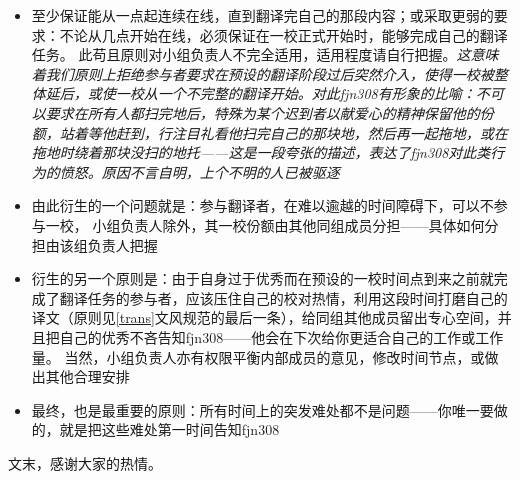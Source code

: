 \documentclass{ctexart}
\begin{document}
\begin{itemize}
    \item 至少保证能从一点起连续在线，直到翻译完自己的那段内容；或采取更弱的要求：不论从几点开始在线，必须保证在一校正式开始时，能够完成自己的翻译任务。{\color{red} 此苟且原则对小组负责人不完全适用，适用程度请自行把握}。\emph{\small 这意味着我们原则上拒绝参与者要求在预设的翻译阶段过后突然介入，使得一校被整体延后，或使一校从一个不完整的翻译开始。对此fjn308有形象的比喻：不可以要求在所有人都扫完地后，特殊为某个迟到者以献爱心的精神保留他的份额，站着等他赶到，行注目礼看他扫完自己的那块地，然后再一起拖地，或在拖地时绕着那块没扫的地托——这是一段夸张的描述，表达了fjn308对此类行为的愤怒。原因不言自明，上个不明的人已被驱逐}
    \item 由此衍生的一个问题就是：参与翻译者，在难以逾越的时间障碍下，可以不参与一校，{\color{red} 小组负责人除外}，其一校份额由其他同组成员分担——具体如何分担由该组负责人把握
    \item 衍生的另一个原则是：由于自身过于优秀而在预设的一校时间点到来之前就完成了翻译任务的参与者，应该压住自己的校对热情，利用这段时间打磨自己的译文（原则见\ref{trans}文风规范的最后一条），给同组其他成员留出专心空间，并且把自己的优秀不吝告知fjn308——他会在下次给你更适合自己的工作或工作量。{\color{red} 当然，小组负责人亦有权限平衡内部成员的意见，修改时间节点，或做出其他合理安排}
    \item 最终，也是最重要的原则：所有时间上的突发难处都不是问题——你唯一要做的，就是把这些难处第一时间告知fjn308
\end{itemize}

文末，感谢大家的热情。
\end{document}
